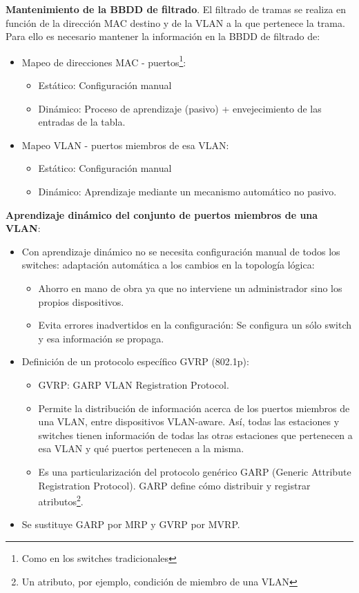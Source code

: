 \documentclass[10pt,portrait, twocolumn]{article}
\begin{document}
\textbf{Mantenimiento de la BBDD de filtrado}. El filtrado de tramas se realiza en función de la dirección MAC destino y de la VLAN a la que pertenece la trama. Para ello es necesario mantener la información en la BBDD de filtrado de:
	\begin{itemize}
		\item Mapeo de direcciones MAC - puertos\footnote{Como en los switches tradicionales}:
			\begin{itemize}
			\item Estático: Configuración manual
			\item Dinámico: Proceso de aprendizaje (pasivo) + envejecimiento de las entradas de la tabla.
			\end{itemize}
		\item Mapeo VLAN - puertos miembros de esa VLAN:
			\begin{itemize}
			\item Estático: Configuración manual
			\item Dinámico: Aprendizaje mediante un mecanismo automático no pasivo.
			\end{itemize}
	\end{itemize}
	
\textbf{Aprendizaje dinámico del conjunto de puertos miembros de una VLAN}:

	\begin{itemize}
	\item Con aprendizaje dinámico no se necesita configuración manual de todos los switches: adaptación automática a los cambios en la topología lógica:
		\begin{itemize}
		\item Ahorro en mano de obra ya que no interviene un administrador sino los propios dispositivos.
		\item Evita errores inadvertidos en la configuración: Se configura un sólo switch y esa información se propaga.
		\end{itemize}
		\item Definición de un protocolo específico GVRP (802.1p):
			\begin{itemize}
			\item GVRP: GARP VLAN Registration Protocol.
			\item Permite la distribución de información acerca de los puertos miembros de una VLAN, entre dispositivos VLAN-aware. Así, todas las estaciones y switches tienen información de todas las otras estaciones que pertenecen a esa VLAN y qué puertos pertenecen a la misma.
			\item Es una particularización del protocolo genérico GARP (Generic Attribute Registration Protocol). GARP define cómo distribuir y registrar atributos\footnote{Un atributo, por ejemplo, condición de miembro de una VLAN}.
			
			\end{itemize}
		\item Se sustituye GARP por MRP y GVRP por MVRP.
	\end{itemize}
	
\end{document}
